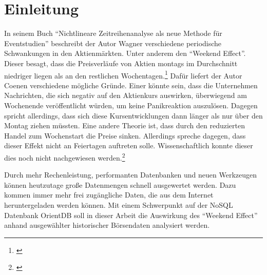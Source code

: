 \section{Einleitung}


In seinem Buch \enquote{Nichtlineare Zeitreihenanalyse als neue Methode für Eventstudien} beschreibt der Autor Wagner verschiedene periodische Schwankungen in den Aktienmärkten. Unter anderem den \enquote{Weekend Effect}. Dieser besagt, dass die Preisverläufe von Aktien montags im Durchschnitt niedriger liegen als an den restlichen Wochentagen.\footnote{\cite[Vgl.][17]{Wagner2019}} Dafür liefert der Autor Coenen verschiedene mögliche Gründe. Einer könnte sein, dass die Unternehmen Nachrichten, die sich negativ auf den Aktienkurs auswirken, überwiegend am Wochenende veröffentlicht würden, um keine Panikreaktion auszulösen. Dagegen spricht allerdings, dass sich diese Kursentwicklungen dann länger als nur über den Montag ziehen müssten. Eine andere Theorie ist, dass durch den reduzierten Handel zum Wochenstart die Preise sinken. Allerdings spreche dagegen, dass dieser Effekt nicht an Feiertagen auftreten solle. Wissenschaftlich konnte dieser dies noch nicht nachgewiesen werden.\footnote{\cite[Vgl.][8]{Coenen2020}}

Durch mehr Rechenleistung, performanten Datenbanken und neuen Werkzeugen können heutzutage große Datenmengen schnell ausgewertet werden. Dazu kommen immer mehr frei zugängliche Daten, die aus dem Internet heruntergeladen werden können. Mit einem Schwerpunkt auf der NoSQL Datenbank OrientDB soll in dieser Arbeit die Auswirkung des \enquote{Weekend Effect} anhand ausgewählter historischer Börsendaten analysiert werden.

\clearpage